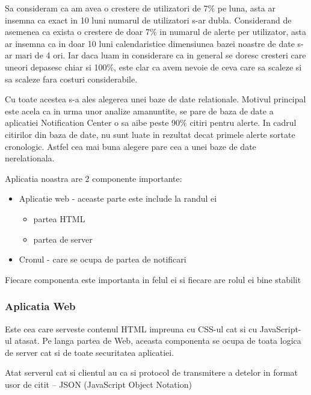\documentclass[conference]{IEEEtran}
\begin{document}
Sa consideram ca am avea o crestere de utilizatori de 7\% pe luna, asta ar insemna ca exact in 10 luni numarul de utilizatori s-ar dubla. Considerand de asemenea ca exista o crestere de doar 7\% in numarul de alerte per utilizator, asta ar insemna ca in doar 10 luni calendaristice dimensiunea bazei noastre de date s-ar mari de 4 ori. Iar daca luam in considerare ca in general se doresc cresteri care uneori depasesc chiar si 100\%, este clar ca avem nevoie de ceva care sa scaleze si sa scaleze fara costuri considerabile.


Cu toate acestea s-a ales alegerea unei baze de date relationale. Motivul principal este acela ca in urma unor analize amanuntite, se pare de baza de date a aplicatiei Notification Center o sa aibe peste 90\% citiri pentru alerte. In cadrul citirilor din baza de date, nu sunt luate in rezultat decat primele alerte sortate cronologic. Astfel cea mai buna alegere pare cea a unei baze de date nerelationala.

Aplicatia noastra are 2 componente importante:
  \begin{itemize}
  	\item Aplicatie web - aceaste parte este include la randul ei
      \begin{itemize}
        \item partea HTML
        \item partea de server
      \end{itemize}
  	\item Cronul - care se ocupa de partea de notificari
  \end{itemize}
  
Fiecare componenta este importanta in felul ei si fiecare are rolul ei bine stabilit

\subsubsection{Aplicatia Web}

Este cea care serveste contenul HTML impreuna cu CSS-ul cat si cu JavaScript-ul atasat. Pe langa partea de Web, aceasta componenta se ocupa de toata logica de server cat si de toate securitatea aplicatiei.

Atat serverul cat si clientul au ca si protocol de transmitere a detelor in format usor de citit -- JSON (JavaScript Object Notation)
\end{document}
